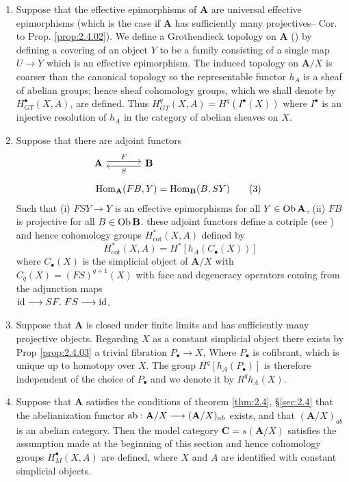 \documentclass[../main]{subfiles}
\begin{document}
\begin{enumerate} [label=(\arabic*)\quad]
  \item Suppose that the effective epimorphisms of $\mathbf A$ are universal effective epimorphisms (which is the case if $\mathbf A$ has sufficiently many projectives-- Cor. to Prop. \ref{prop:2.4.02}). We define a Grothendieck topology on $\mathbf A$ (\cite{artin_grothendieck_1962}) by defining a covering of an object $Y$ to be a family consisting of a single map $U \longrightarrow Y$ which is an effective epimorphism. The induced topology on $\mathbf{A} / X$ is coarser than the canonical topology so the representable functor $h_{A}$ is a sheaf of abelian groups; hence sheaf cohomology groups, which we shall denote by $H_{GT}^{\bullet} (X,A)$, are defined. Thus $H_{GT}^{q} (X,A) = H^q(I^\bullet (X))$ where $I^\bullet$ is an injective resolution of $h_{A}$ in the category of abelian sheaves on $X$.


    \item Suppose that there are adjoint functors 
      \begin{align} \label{eq:2.5.3}
        \begin{tikzcd}[column sep = large, ampersand replacement = \&]
          \mathbf{A} \rar["F", shift left] \& \lar["S", shift left] \mathbf{B} 
          \end{tikzcd}  \notag \\[0.5em] 
          \Hom_{\mathbf{A}}(FB,Y) &= \Hom_{\mathbf{B}}(B,SY) \tag{3}
      \end{align}
      Such that (i) $FSY \longrightarrow  Y$ is an effective epimorphisms for all $Y \in \operatorname{Ob} \mathbf{A}$, (ii) $FB$ is projective for all $B \in \operatorname{Ob} \mathbf{B} $. these adjoint functors define a cotriple (see \cite{barr_acyclic_1966}) and hence cohomology groups $H_{\cot}^{*}(X,A)$ defined by 
      \[ 
H_{\cot}^{*} (X,A) = H^{*}[h_{A}(C_\bullet(X))] 
      \] 
      where $C_\bullet(X)$ is the simplicial object of $\mathbf{A} / X$ with $C_{q}(X) = (FS)^{q+1}(X)$ with face and degeneracy operators coming from the adjunction maps\\ $\operatorname{id} \longrightarrow  SF,\, FS \longrightarrow  \operatorname{id} $. 

    \item Suppose that $\mathbf A$ is closed under finite limits and has sufficiently many projective objects. Regarding $X$ as a constant simplicial object there exists by Prop \ref{prop:2.4.03} a trivial fibration $P_\bullet \longrightarrow  X$, Where $P_\bullet$ is cofibrant, which is unique up to homotopy over $X$. The group $H^q [h_{A}(P_\bullet)]$ is therefore independent of the choice of $P_\bullet$ and we denote it by $R^{q}h_{A}(X)$.


      \item Suppose that $\mathbf A$ satisfies the conditions of theorem \ref{thm:2.4}, \S\ref{sec:2.4} that the abelianization functor $\operatorname{ab}: \mathbf{A} / X \longrightarrow  (\mathbf{A} / X)_{ab}$ exists, and that $(\mathbf{A} / X)_{ab}$ is an abelian category. Then the model category $\mathbf C = s (\mathbf{A} / X)$ satisfies the assumption made at the beginning of this section and hence cohomology groups $H_{M}^{\bullet} (X,A)$ are defined, where $X$ and $A$ are identified with constant simplicial objects.
  \end{enumerate}
\end{document}
